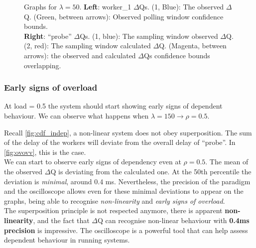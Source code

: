 \begin{figure}[H]
\begin{subfigure}{.5\textwidth}
                \label{fig:norm_ex_2}
            \end{subfigure}
            \caption{Graphs for $\lambda = 50$. \textbf{Left}: worker\_1 $\Delta$Qs. (1, Blue): The observed $\Delta$Q. (Green, between arrows): Observed polling window confidence bounds. \\
            \textbf{Right}: ``probe'' $\Delta$Qs. (1, blue): The sampling window observed $\Delta$Q. (2, red): The sampling window calculated $\Delta$Q. (Magenta, between arrows): the observed and calculated $\Delta$Qs confidence bounds overlapping.}
            \label{fig:norm_ex}
        \end{figure}
    
\subsubsection{Early signs of overload}
    
    At load = 0.5 the system should start showing early signs of dependent behaviour. We can observe what happens when $\lambda = 150 \rightarrow \rho = 0.5$.
    
    Recall \ref{fig:cdf_indep}, a non-linear system does not obey superposition. The sum of the delay of the workers will deviate from the overall delay of ``probe''. In \cref{fig:ovovv}, this is the case. \\
    We can start to observe early signs of dependency even at $\rho = 0.5$. The mean of the observed $\Delta$Q is deviating from the calculated one. At the 50th percentile the deviation is \textit{minimal}, around 0.4 ms. Nevertheless, the precision of the paradigm and the oscilloscope allows even for these minimal deviations to appear on the graphs, being able to recognise \textit{non-linearity} and \textit{early signs of overload}. \\
    The superposition principle is not respected anymore, there is apparent \textbf{non-linearity}, and the fact that $\Delta$Q can recognise non-linear behaviour with \textbf{0.4ms precision} is impressive. The oscilloscope is a powerful tool that can help assess dependent behaviour in running systems.
 
